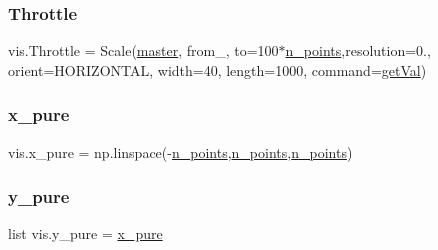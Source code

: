 \mbox{\label{namespacevis_a294e676e5dc073fa5ddcea9955943af9}} 
\subsubsection{\texorpdfstring{Throttle}{Throttle}}
{\footnotesize\ttfamily vis.\+Throttle = Scale(\hyperlink{namespacevis_a6ee13a8bd702057064f342e00fe8eefd}{master}, from\+\_, to=100$\ast$\hyperlink{namespacevis_a670f391917319e53a1373004ad47a325}{n\+\_\+points},resolution=0., orient=H\+O\+R\+I\+Z\+O\+N\+T\+AL, width=40, length=1000, command=\hyperlink{namespacevis_a987b76332d0d03b66af97331e5e4b442}{get\+Val})}

\mbox{\label{namespacevis_a4086117aa0dbd872a99b2f3738d56ae6}} 
\subsubsection{\texorpdfstring{x\+\_\+pure}{x\_pure}}
{\footnotesize\ttfamily vis.\+x\+\_\+pure = np.\+linspace(-\/\hyperlink{namespacevis_a670f391917319e53a1373004ad47a325}{n\+\_\+points},\hyperlink{namespacevis_a670f391917319e53a1373004ad47a325}{n\+\_\+points},\hyperlink{namespacevis_a670f391917319e53a1373004ad47a325}{n\+\_\+points})}

\mbox{\label{namespacevis_ac14aca4ab4de023eb6759df589da3396}} 
\subsubsection{\texorpdfstring{y\+\_\+pure}{y\_pure}}
{\footnotesize\ttfamily list vis.\+y\+\_\+pure = \hyperlink{namespacevis_a4086117aa0dbd872a99b2f3738d56ae6}{x\+\_\+pure}}


